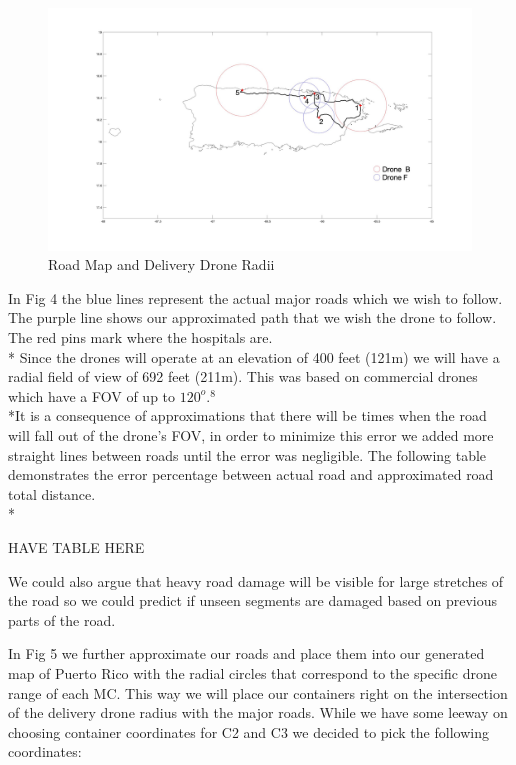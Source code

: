 \documentclass[a4paper,12pt]{article}
\begin{document}
\begin{figure}[h]
\centering
\includegraphics[scale =0.15]{CircleRoadMap}
\caption{Road Map and Delivery Drone Radii}
\label{road-approx}
\end{figure}

\newpage
In Fig 4 the blue lines represent the actual major roads which we wish to follow. The purple line shows our approximated path that we wish the drone to follow. The red pins mark where the hospitals are.\\*
Since the drones will operate at an elevation of 400 feet (121m) we will have a radial field of view of 692 feet (211m). This was based on commercial drones which have a FOV of up to $120^{o}$$.^{8}$
\\*It is a consequence of approximations that there will be times when the road will fall out of the drone's FOV, in order to minimize this error we added more straight lines between roads until the error was negligible.
The following table demonstrates the error percentage between actual road and approximated road total distance.\\*

HAVE TABLE HERE


We could also argue that heavy road damage will be visible for large stretches of the road so we could predict if unseen segments are damaged based on previous parts of the road.

In Fig 5 we further approximate our roads and place them into our generated map of Puerto Rico with the radial circles that correspond to the specific drone range of each MC.
This way we will place our containers right on the intersection of the delivery drone radius with the major roads.  While we have some leeway on choosing container coordinates for C2 and C3 we decided to pick the following coordinates:
\end{document}
